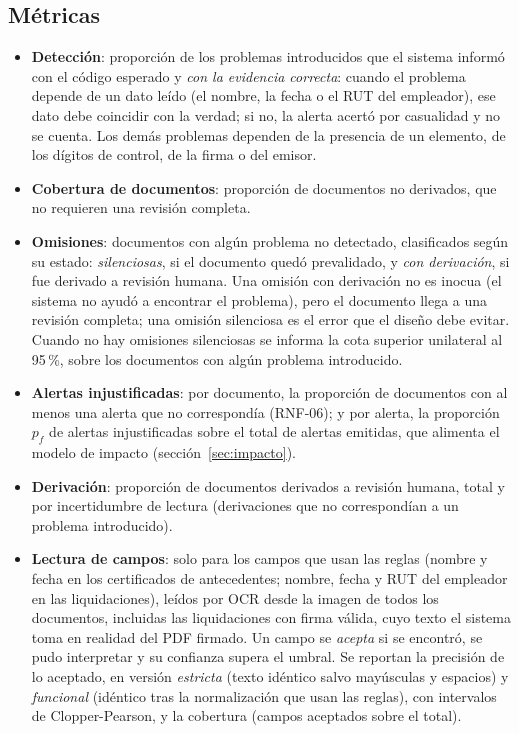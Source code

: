 \documentclass[11pt,a4paper]{article}
\begin{document}
\subsection{Métricas}
\label{sec:metricas}
\begin{itemize}
  \item \textbf{Detección}: proporción de los problemas introducidos que el sistema informó con el código esperado y \emph{con la evidencia correcta}: cuando el problema depende de un dato leído (el nombre, la fecha o el RUT del empleador), ese dato debe coincidir con la verdad; si no, la alerta acertó por casualidad y no se cuenta. Los demás problemas dependen de la presencia de un elemento, de los dígitos de control, de la firma o del emisor.
  \item \textbf{Cobertura de documentos}: proporción de documentos no derivados, que no requieren una revisión completa.
  \item \textbf{Omisiones}: documentos con algún problema no detectado, clasificados según su estado: \emph{silenciosas}, si el documento quedó prevalidado, y \emph{con derivación}, si fue derivado a revisión humana. Una omisión con derivación no es inocua (el sistema no ayudó a encontrar el problema), pero el documento llega a una revisión completa; una omisión silenciosa es el error que el diseño debe evitar. Cuando no hay omisiones silenciosas se informa la cota superior unilateral al 95\,\%, sobre los documentos con algún problema introducido.
  \item \textbf{Alertas injustificadas}: por documento, la proporción de documentos con al menos una alerta que no correspondía (RNF-06); y por alerta, la proporción $p_f$ de alertas injustificadas sobre el total de alertas emitidas, que alimenta el modelo de impacto (sección~\ref{sec:impacto}).
  \item \textbf{Derivación}: proporción de documentos derivados a revisión humana, total y por incertidumbre de lectura (derivaciones que no correspondían a un problema introducido).
  \item \textbf{Lectura de campos}: solo para los campos que usan las reglas (nombre y fecha en los certificados de antecedentes; nombre, fecha y RUT del empleador en las liquidaciones), leídos por OCR desde la imagen de todos los documentos, incluidas las liquidaciones con firma válida, cuyo texto el sistema toma en realidad del PDF firmado. Un campo se \emph{acepta} si se encontró, se pudo interpretar y su confianza supera el umbral. Se reportan la precisión de lo aceptado, en versión \emph{estricta} (texto idéntico salvo mayúsculas y espacios) y \emph{funcional} (idéntico tras la normalización que usan las reglas), con intervalos de Clopper-Pearson, y la cobertura (campos aceptados sobre el total).

\end{itemize}
\end{document}
